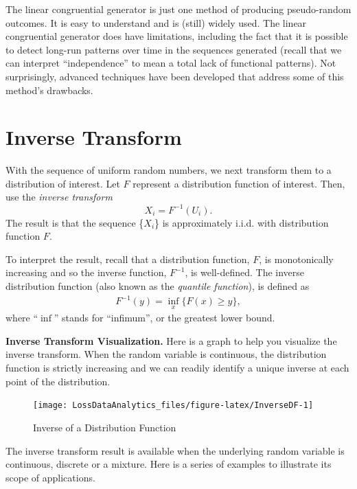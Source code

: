 \documentclass[]{book}
\theoremstyle{definition}
\theoremstyle{definition}
\theoremstyle{definition}
\theoremstyle{remark}
\begin{document}
The linear congruential generator is just one method of producing
pseudo-random outcomes. It is easy to understand and is (still) widely
used. The linear congruential generator does have limitations, including
the fact that it is possible to detect long-run patterns over time in
the sequences generated (recall that we can interpret ``independence''
to mean a total lack of functional patterns). Not surprisingly, advanced
techniques have been developed that address some of this method's
drawbacks.

\section{Inverse Transform}\label{inverse-transform}

With the sequence of uniform random numbers, we next transform them to a
distribution of interest. Let \(F\) represent a distribution function of
interest. Then, use the \emph{inverse transform}
\[X_i=F^{-1}\left( U_i \right) .\] The result is that the sequence
\{\(X_{i}\)\} is approximately i.i.d. with distribution function \(F\).

To interpret the result, recall that a distribution function, \(F\), is
monotonically increasing and so the inverse function, \(F^{-1}\), is
well-defined. The inverse distribution function (also known as the
\emph{quantile function}), is defined as \[\begin{aligned}
F^{-1}(y) = \inf_x \{ F(x) \ge y \} ,\end{aligned}\] where ``\(\inf\)''
stands for ``infimum'', or the greatest lower bound.

\textbf{Inverse Transform Visualization.} Here is a graph to help you
visualize the inverse transform. When the random variable is continuous,
the distribution function is strictly increasing and we can readily
identify a unique inverse at each point of the distribution.

\begin{figure}

{\centering \texttt{[image: LossDataAnalytics\_files/figure-latex/InverseDF-1]} 

}

\caption{Inverse of a Distribution Function}\label{fig:InverseDF}
\end{figure}

The inverse transform result is available when the underlying random
variable is continuous, discrete or a mixture. Here is a series of
examples to illustrate its scope of applications.
\end{document}
